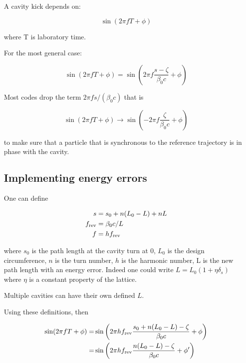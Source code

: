 A cavity kick depends on:

\begin{equation}
\sin(2 \pi f T + \phi)
\end{equation}

where T is laboratory time.


For the most general case:

\begin{equation}
\sin(2 \pi f T + \phi) = \sin\left(2 \pi f \frac{s-\zeta}{\beta_0 c}  + \phi \right)
\end{equation}

Most codes drop the term $2 \pi f s / (\beta_0 c)$ that is

\begin{equation}
\sin(2 \pi f T + \phi) \to  \sin\left(- 2 \pi f \frac{\zeta}{\beta_0 c} + \phi\right)
\end{equation}

to make sure that a particle that is synchronous to the reference trajectory is in phase with the cavity.


\subsection{Implementing energy errors}

One can define

\begin{equation}
\begin{aligned}
s &= s_0 + n (L_0-L) + n L\\
f_{\rm rev} &= \beta_0 c / L\\
f &= h f_{\rm rev}
\end{aligned}
\end{equation}

where $s_0$ is the path length at the cavity turn at 0, $L_0$ is the design circumference, $n$ is the turn number, $h$ is the harmonic number, L is the new path length with an energy error. Indeed one could write $L=L_0(1 +\eta \delta_s)$ where $\eta$ is a constant property of the lattice.

Multiple cavities can have their own defined $L$.

Using these definitions, then


\begin{align}
\sin(2 \pi f T + \phi) =
&\sin\left(2 \pi h f_{\rm rev} \frac{s_0 + n(L_0-L) -\zeta}{\beta_0 c}  + \phi\right)\\
=&\sin\left(2 \pi h f_{\rm rev} \frac{n(L_0-L) -\zeta}{\beta_0 c}  + \phi'\right)
\end{align}


